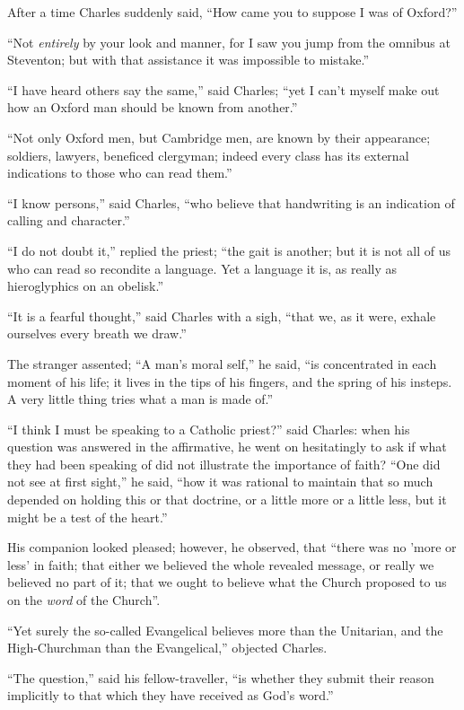 After a time Charles suddenly said, ``How came you to suppose I
was of Oxford?''

``Not \emph{entirely} by your look and manner, for I saw you
jump from the omnibus at Steventon; but with that assistance it was
impossible to mistake.''

``I have heard others say the same,'' said Charles;
``yet I can't myself make out how an Oxford man should be known
from another.''

``Not only Oxford men, but Cambridge men, are known by their
appearance; soldiers, lawyers, beneficed clergyman; indeed every class
has its external indications to those who can read them.''

``I know persons,'' said Charles, ``who believe that
handwriting is an indication of calling and character.''

``I do not doubt it,'' replied the priest; ``the gait
is another; but it is not all of us who can read so recondite a
language. Yet a language it is, as really as hieroglyphics on an
obelisk.''

``It is a fearful thought,'' said Charles with a sigh,
``that we, as it were, exhale ourselves every breath we
draw.''

The stranger assented; ``A man's moral self,'' he said,
``is concentrated in each moment of his life; it lives in the tips
of his fingers, and the spring of his insteps. A very little thing
tries what a man is made of.''

``I think I must be speaking to a Catholic priest?'' said
Charles: when his question was answered in the affirmative, he went on
hesitatingly to ask if what they had been speaking of did not
illustrate the importance of faith? ``One did not see at first
sight,'' he said, ``how it was rational to maintain that so
much depended on holding this or that doctrine, or a little more or a
little less, but it might be a test of the heart.''

His companion looked pleased; however, he observed, that
``there was no 'more or less' in faith; that either we believed
the whole revealed message, or really we believed no part of it; that
we ought to believe what the Church proposed to us on the \emph{word}
of the Church''.

``Yet surely the so-called Evangelical believes more than the
Unitarian, and the High-Churchman than the Evangelical,'' objected
Charles.

``The question,'' said his fellow-traveller, ``is
whether they submit their reason implicitly to that which they have
received as God's word.''


